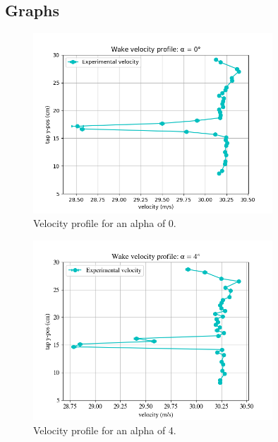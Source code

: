 \documentclass[11pt, letterpaper]{article}
\begin{document}
\begin{appendices}
\section{Graphs}


\begin{figure}[!hpt]
        \centering        
        \includegraphics[width=0.8\textwidth]{Figures/vel-graphs/vel-a0.png}
        \caption{Velocity profile for an alpha of 0\degree.}
        \label{fig:vel-a0}
\end{figure}

\begin{figure}[!hpt]
        \centering        
        \includegraphics[width=0.8\textwidth]{Figures/vel-graphs/vel-a4.png}
        \caption{Velocity profile for an alpha of 4\degree.}
        \label{fig:vel-a4}
\end{figure}


\end{appendices}
\end{document}
